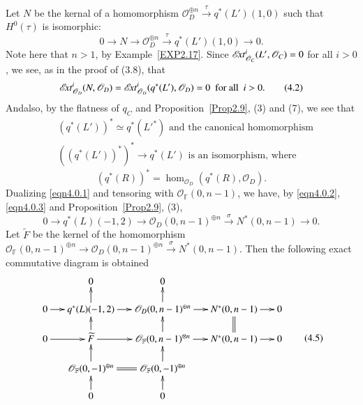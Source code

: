 Let $N$ be the kernal of a homomorphism $\mathscr{O}_{D}^{\oplus
  n}\xrightarrow{\tau} q^{\ast}(L')(1,0)$ such that $H^{0}(\tau)$
is isomorphic: 
\setcounter{equation}{0}
\begin{equation*}\label{eqn4.0.1}
0\to N\to \mathscr{O}^{\oplus n}_D\xrightarrow{\tau}
q^{\ast}(L')(1,0)\to 0.\tag{4.1}
\end{equation*}
Note here that $n>1$, by Example~\ref{EXP2.17}. Since
$\mathscr{E}\!{\it xt}^{i}_{\mathscr{O}_{C}}(L',\mathscr{O}_C)=0$  for all $i>0$, we
see, as in the proof of (3.8), that 
\begin{equation}\label{eqn4.0.2}
\mathscr{E}\!{\it xt}^{i}_{\mathscr{O}_D}(N,\mathscr{O}_D)=\mathscr{E}\!{\it xt}^{i}_{\mathscr{O}_D}(q^{\ast}(L'),\mathscr{O}_D)=0
\text{~ for all~ } i>0.\tag{4.2}
\end{equation}
And\pageoriginale also, by the flatness of $q_C$ and
Proposition~\ref{Prop2.9}, (3) and (7), we see that 
\begin{align*}
&(q^{\ast}(L'))^{\ast}\simeq q^{\ast}({L'}^{\ast}) \text{ and the canonical
homomorphism}\\
&((q^{\ast}(L'))^{\ast})^{\ast}\to q^{\ast}(L') \text{ is
an isomorphism, where}\tag{4.3}\label{eqn4.0.3}
\end{align*}
$$
(q^{\ast}(R))^{\ast}=\hom_{\mathscr{O}_D}(q^{\ast}(R),\mathscr{O}_D).
$$
Dualizing \eqref{eqn4.0.1} and tensoring with
$\mathscr{O}_{\mathbb{F}}(0,n-1)$, we have, by \eqref{eqn4.0.2},
\eqref{eqn4.0.3} and Proposition~\ref{Prop2.9}, (3), 
\begin{equation*}\label{eqn4.0.4}
0\to q^{\ast}(L)(-1,2)\to \mathscr{O}_D(0, n-1)^{\oplus
  n}\xrightarrow{\sigma} N^{\ast}(0,n-1)\to 0.\tag{4.4}
\end{equation*}
Let $\widetilde{F}$ be the kernel of the homomorphism
$\mathscr{O}_{\mathbb{F}}(0,n-1)^{\oplus n}\to
\mathscr{O}_{D}(0,n-1)^{\oplus n}\xrightarrow{\sigma}
N^{\ast}(0,n-1)$. Then the following exact commutative diagram is
obtained 
\begin{equation*}\label{eqn4.0.5}
\vcenter{
\xymatrix@=.5cm{&0&0&&\\
0\ar[r]&q^{\ast}(L)(-1,2)\ar[u]\ar[r]&\mathscr{O}_D(0,n-1)^{\oplus n}\ar[u]\ar[r]&
N^{\ast}(0,n-1)\ar[r]&0\\
0\ar[r]&\widetilde{F}\ar[u]\ar[r]&\mathscr{O}_{\mathbb{F}}(0,n-1)^{\otimes
  n}\ar[u]\ar[r]& N^{\ast}(0,n-1)\ar@{=}[u]\ar[r]&0\\
&\mathscr{O}_{\mathbb{F}}(0,-1)^{\oplus
  n}\ar[u]\ar@{=}[r]&\mathscr{O}_{\mathbb{F}}(0,-1)^{\oplus n}\ar[u]&&\\
& 0\ar[u] & 0\ar[u] &&}}\tag{4.5}
\end{equation*}

